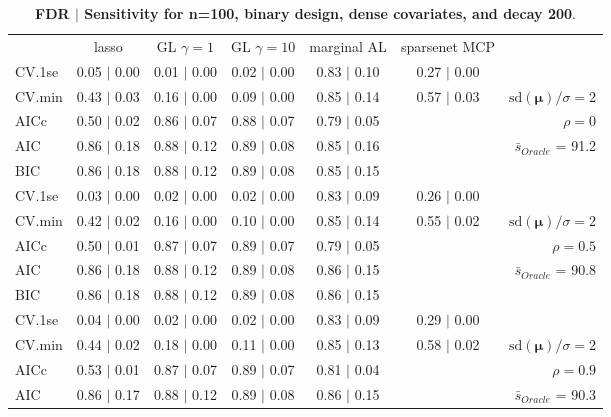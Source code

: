 \begin{table}\vspace{-.5cm}
\caption[l]{ {\it }
{ \bf FDR $\boldsymbol{\mid}$ Sensitivity for n=100, binary design, dense covariates, and  decay  200}.}
\vspace{-.5cm}
\footnotesize{}
\begin{center}
\begin{tabular}{l*{5}{c}|r}
 & lasso & GL $\gamma=1$ & GL $\gamma=10$ & marginal AL & sparsenet MCP  & \\
 \cline{1-7}
CV.1se & 0.05 $\mid$ 0.00 & 0.01 $\mid$ 0.00 & 0.02 $\mid$ 0.00 & 0.83 $\mid$ 0.10 & 0.27 $\mid$ 0.00 & \\
CV.min & 0.43 $\mid$ 0.03 & 0.16 $\mid$ 0.00 & 0.09 $\mid$ 0.00 & 0.85 $\mid$ 0.14 & 0.57 $\mid$ 0.03 &  $\mathrm{sd}(\mathbf{\mu})/\sigma=2$ \\
AICc & 0.50 $\mid$ 0.02 & 0.86 $\mid$ 0.07 & 0.88 $\mid$ 0.07 & 0.79 $\mid$ 0.05 & & $\rho=0$ \\
AIC & 0.86 $\mid$ 0.18 & 0.88 $\mid$ 0.12 & 0.89 $\mid$ 0.08 & 0.85 $\mid$ 0.16 & &  \multirow{2}{*}{$\bar{s}_{Oracle}$ = 91.2} \\
BIC & 0.86 $\mid$ 0.18 & 0.88 $\mid$ 0.12 & 0.89 $\mid$ 0.08 & 0.85 $\mid$ 0.15 & &  \\
 \hline 
CV.1se & 0.03 $\mid$ 0.00 & 0.02 $\mid$ 0.00 & 0.02 $\mid$ 0.00 & 0.83 $\mid$ 0.09 & 0.26 $\mid$ 0.00 & \\
CV.min & 0.42 $\mid$ 0.02 & 0.16 $\mid$ 0.00 & 0.10 $\mid$ 0.00 & 0.85 $\mid$ 0.14 & 0.55 $\mid$ 0.02 &  $\mathrm{sd}(\mathbf{\mu})/\sigma=2$ \\
AICc & 0.50 $\mid$ 0.01 & 0.87 $\mid$ 0.07 & 0.89 $\mid$ 0.07 & 0.79 $\mid$ 0.05 & & $\rho=0.5$ \\
AIC & 0.86 $\mid$ 0.18 & 0.88 $\mid$ 0.12 & 0.89 $\mid$ 0.08 & 0.86 $\mid$ 0.15 & &  \multirow{2}{*}{$\bar{s}_{Oracle}$ = 90.8} \\
BIC & 0.86 $\mid$ 0.18 & 0.88 $\mid$ 0.12 & 0.89 $\mid$ 0.08 & 0.86 $\mid$ 0.15 & &  \\
 \hline 
CV.1se & 0.04 $\mid$ 0.00 & 0.02 $\mid$ 0.00 & 0.02 $\mid$ 0.00 & 0.83 $\mid$ 0.09 & 0.29 $\mid$ 0.00 & \\
CV.min & 0.44 $\mid$ 0.02 & 0.18 $\mid$ 0.00 & 0.11 $\mid$ 0.00 & 0.85 $\mid$ 0.13 & 0.58 $\mid$ 0.02 &  $\mathrm{sd}(\mathbf{\mu})/\sigma=2$ \\
AICc & 0.53 $\mid$ 0.01 & 0.87 $\mid$ 0.07 & 0.89 $\mid$ 0.07 & 0.81 $\mid$ 0.04 & & $\rho=0.9$ \\
AIC & 0.86 $\mid$ 0.17 & 0.88 $\mid$ 0.12 & 0.89 $\mid$ 0.08 & 0.86 $\mid$ 0.15 & &  \multirow{2}{*}{$\bar{s}_{Oracle}$ = 90.3} \\

\end{tabular}
\end{center}
\end{table}
